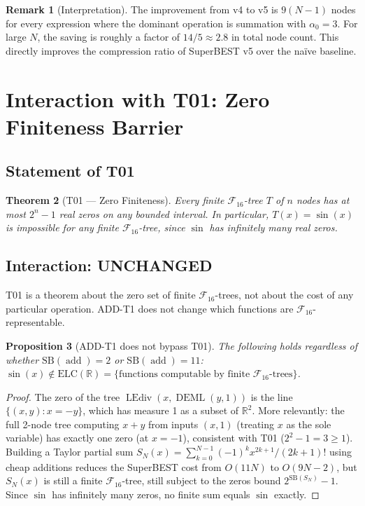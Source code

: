 \documentclass[12pt,a4paper]{article}
\newtheorem{theorem}{Theorem}[section]
\newtheorem{proposition}[theorem]{Proposition}
\theoremstyle{definition}
\newtheorem{remark}[theorem]{Remark}
\newcommand{\DEML}{\operatorname{DEML}}
\newcommand{\LEdiv}{\operatorname{LEdiv}}
\newcommand{\addop}{\operatorname{add}}
\newcommand{\SB}{\mathrm{SB}}
\newcommand{\F}{\mathcal{F}_{16}}
\newcommand{\ELC}{\mathrm{ELC}(\mathbb{R})}
\newcommand{\R}{\mathbb{R}}
\newcommand{\Unchanged}{\textcolor{unchanged}{\textbf{UNCHANGED}}}
\begin{document}
\begin{remark}[Interpretation]
The improvement from v4 to v5 is $9(N-1)$ nodes for every expression where
the dominant operation is summation with $\alpha_0=3$.  For large $N$, the saving
is roughly a factor of $14/5 \approx 2.8$ in total node count.  This directly
improves the compression ratio of SuperBEST v5 over the na\"ive baseline.
\end{remark}

\section{Interaction with T01: Zero Finiteness Barrier}
\label{sec:T01}

\subsection{Statement of T01}

\begin{theorem}[T01 --- Zero Finiteness]
Every finite $\F$-tree $T$ of $n$ nodes has at most $2^n - 1$ real zeros
on any bounded interval.  In particular, $T(x)=\sin(x)$ is impossible for
any finite $\F$-tree, since $\sin$ has infinitely many real zeros.
\end{theorem}

\subsection{Interaction: \Unchanged}

T01 is a theorem about the zero set of finite $\F$-trees, not about the cost
of any particular operation.  ADD-T1 does not change which functions are
$\F$-representable.

\begin{proposition}[ADD-T1 does not bypass T01]
\label{prop:T01-unchanged}
The following holds regardless of whether $\SB(\addop)=2$ or $\SB(\addop)=11$:
$\sin(x) \notin \ELC = \{\text{functions computable by finite }\F\text{-trees}\}$.
\end{proposition}

\begin{proof}
The zero of the tree $\LEdiv(x,\DEML(y,1))$ is the line $\{(x,y) : x=-y\}$,
which has measure 1 as a subset of $\R^2$.  More relevantly: the full 2-node
tree computing $x+y$ from inputs $(x,1)$ (treating $x$ as the sole variable)
has exactly one zero (at $x=-1$), consistent with T01 ($2^2-1 = 3 \geq 1$).
Building a Taylor partial sum $S_N(x) = \sum_{k=0}^{N-1} (-1)^k x^{2k+1}/(2k+1)!$
using cheap additions reduces the SuperBEST cost from $O(11N)$ to $O(9N-2)$,
but $S_N(x)$ is still a finite $\F$-tree, still subject to the zeros bound
$2^{\SB(S_N)}-1$.  Since $\sin$ has infinitely many zeros, no finite sum equals
$\sin$ exactly.
\end{proof}
\end{document}
